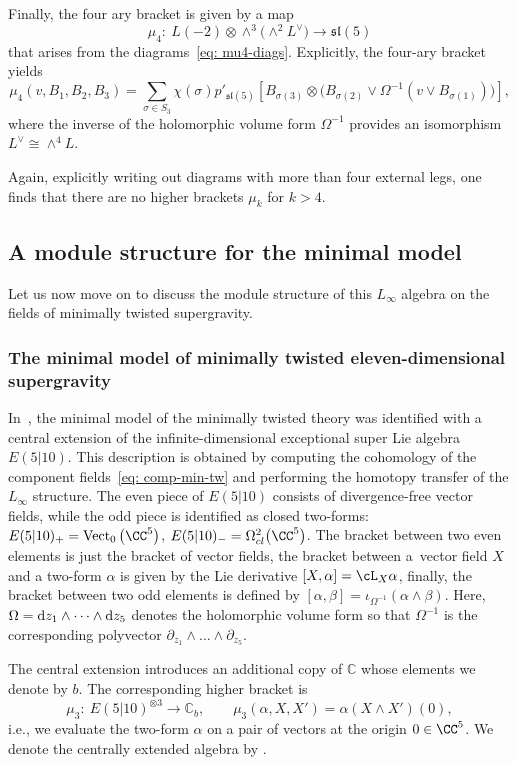 \documentclass[10pt,a4paper]{amsart}
\numberwithin{equation}{section}
\theoremstyle{definition}
\def\C{\mathbb{C}}
\DeclareMathOperator{\Vect}{Vect}
\def\d{{\rm d}}
\begin{document}
Finally, the four ary bracket is given by a map
\[
 \mu_4 \colon\ L(-2) \otimes \wedge^3\big(\wedge^2 L^\vee\big) \longrightarrow \mathfrak{sl}(5)
\]
that arises from the diagrams~\eqref{eq: mu4-diags}. Explicitly, the four-ary bracket yields
\[
 \mu_4(v,B_1,B_2,B_3) = \sum_{\sigma \in S_3} \chi(\sigma) p'_{\mathfrak{sl}(5)} \left[ B_{\sigma(3)} \otimes \big( B_{\sigma(2)} \vee \Omega^{-1} (v \vee B_{\sigma(1)}) \big) \right],
\]
where the inverse of the holomorphic volume form $\Omega^{-1}$ provides an isomorphism $L^\vee \cong \wedge^4 L$.

Again, explicitly writing out diagrams with more than four external legs, one finds that there are no higher brackets $\mu_k$ for $k>4$.


\subsection{A module structure for the minimal model} \label{sec: min-module}
Let us now move on to discuss the module structure of this $L_\infty$ algebra on the fields of minimally twisted supergravity.

\subsubsection{The minimal model of minimally twisted eleven-dimensional supergravity}
In~\cite{RSW}, the minimal model of the minimally twisted theory was identified with a central extension of the infinite-dimensional exceptional super Lie algebra $E(5|10)$. This description is obtained by computing the cohomology of the component fields~\eqref{eq: comp-min-tw} and performing the homotopy transfer of the $L_\infty$ structure. The even piece of $E(5|10)$ consists of divergence-free vector fields, while the odd piece is identified as closed two-forms:
$
 E(5|10)_+ = \Vect_0\big(\CC^5\big) $, $ E(5|10)_- = \Omega^2_{cl}\big(\CC^5\big) $.
The bracket between two even elements is just the bracket of vector fields, the bracket between a~vector field $X$ and a two-form $\alpha$ is given by the Lie derivative
$
 [X,\alpha] = \cL_X \alpha$,
finally, the bracket between two odd elements is defined by
$
 [\alpha, \beta] = \iota_{\Omega^{-1}} (\alpha \wedge \beta)$.
Here, $\Omega = \d z_1 \wedge \dots \wedge \d z_5$ denotes the holomorphic volume form so that $\Omega^{-1}$ is the corresponding polyvector $\partial_{z_1} \wedge \dots \wedge \partial_{z_5}$.

The central extension introduces an additional copy of $\C$ whose elements we denote by $b$. The corresponding higher bracket is
\[ %
 \mu_3\colon\ E(5|10)^{\otimes 3} \longrightarrow \C_b, \qquad \mu_3(\alpha, X, X') = \alpha(X \wedge X')(0) ,
\]
i.e., we evaluate the two-form $\alpha$ on a pair of vectors at the origin $0 \in \CC^5$. We denote the centrally extended algebra by .
\end{document}
